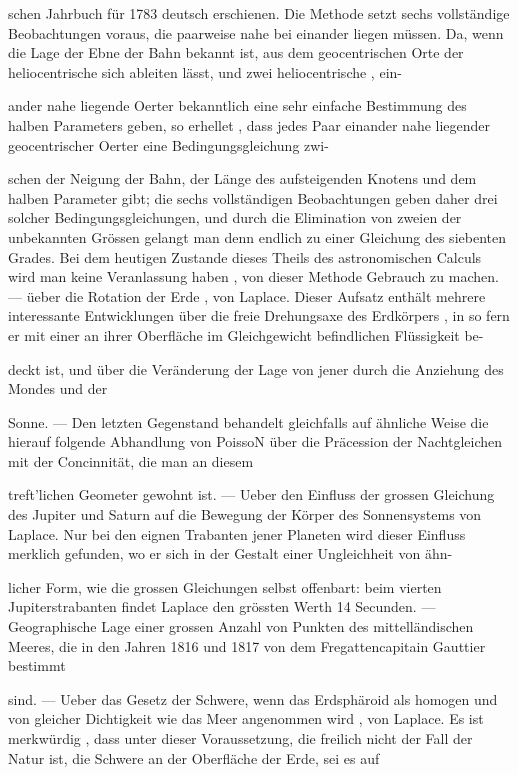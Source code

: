 \documentclass[10pt,a4paper]{article}
\begin{document}
schen Jahrbuch für 1783 deutsch erschienen. Die Methode setzt sechs vollständige Beobachtungen voraus, die paarweise nahe bei einander liegen müssen. Da, wenn die Lage der Ebne der Bahn bekannt ist, aus dem geocentrischen Orte der heliocentrische sich ableiten lässt, und zwei heliocentrische , ein-

ander nahe liegende Oerter bekanntlich eine sehr einfache Bestimmung des halben Parameters geben, so erhellet , dass jedes Paar einander nahe liegender geocentrischer Oerter eine Bedingungsgleichung zwi-

schen der Neigung der Bahn, der Länge des aufsteigenden Knotens und dem halben Parameter gibt; die sechs vollständigen Beobachtungen geben daher drei solcher Bedingungsgleichungen, und durch die Elimination von zweien der unbekannten Grössen gelangt man denn endlich zu einer Gleichung des siebenten Grades. Bei dem heutigen Zustande dieses Theils des astronomischen Calculs wird man keine Veranlassung haben , von dieser Methode Gebrauch zu machen. — üeber die Rotation der Erde , von Laplace. Dieser Aufsatz enthält mehrere interessante Entwicklungen über die freie Drehungsaxe des Erdkörpers , in so fern er mit einer an ihrer Oberfläche im Gleichgewicht befindlichen Flüssigkeit be-

deckt ist, und über die Veränderung der Lage von jener durch die Anziehung des Mondes und der

Sonne. — Den letzten Gegenstand behandelt gleichfalls auf ähnliche Weise die hierauf folgende Abhandlung von PoissoN über die Präcession der Nachtgleichen mit der Concinnität, die man an diesem

treft'lichen Geometer gewohnt ist. — Ueber den Einfluss der grossen Gleichung des Jupiter und Saturn auf die Bewegung der Körper des Sonnensystems von Laplace. Nur bei den eignen Trabanten jener Planeten wird dieser Einfluss merklich gefunden, wo er sich in der Gestalt einer Ungleichheit von ähn-

licher Form, wie die grossen Gleichungen selbst offenbart: beim vierten Jupiterstrabanten findet Laplace den grössten Werth 14 Secunden. — Geographische Lage einer grossen Anzahl von Punkten des mittelländischen Meeres, die in den Jahren 1816 und 1817 von dem Fregattencapitain Gauttier bestimmt

sind. — Ueber das Gesetz der Schwere, wenn das Erdsphäroid als homogen und von gleicher Dichtigkeit wie das Meer angenommen wird , von Laplace. Es ist merkwürdig , dass unter dieser Voraussetzung, die freilich nicht der Fall der Natur ist, die Schwere an der Oberfläche der Erde, sei es auf
\end{document}
